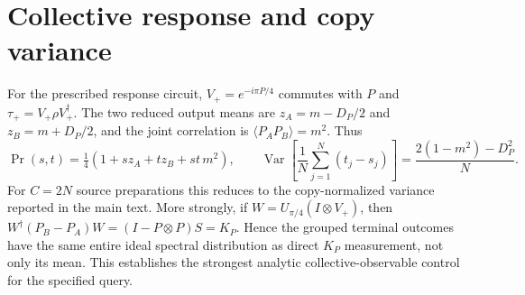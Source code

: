 \documentclass[pdflatex,sn-mathphys-num]{sn-jnl}
\begin{document}
\appendix
\section{Collective response and copy variance}
For the prescribed response circuit, $V_+=e^{-i\pi P/4}$ commutes with $P$ and $\tau_+=V_+\rho V_+^\dagger$. The two reduced output means are $z_A=m-D_P/2$ and $z_B=m+D_P/2$, and the joint correlation is $\langle P_A P_B\rangle=m^2$. Thus
\begin{equation}
 \Pr(s,t)=\tfrac14(1+s z_A+t z_B+st\,m^2),\qquad
 \operatorname{Var}\!\left[\frac1N\sum_{j=1}^N(t_j-s_j)\right]
 =\frac{2(1-m^2)-D_P^2}{N}.
\end{equation}
For $C=2N$ source preparations this reduces to the copy-normalized variance reported in the main text. More strongly, if $W=U_{\pi/4}(I\otimes V_+)$, then $W^\dagger(P_B-P_A)W=(I-P\otimes P)S=K_P$. Hence the grouped terminal outcomes have the same entire ideal spectral distribution as direct $K_P$ measurement, not only its mean. This establishes the strongest analytic collective-observable control for the specified query.


\end{document}
